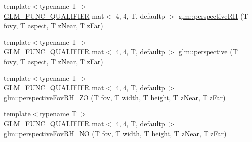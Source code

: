 \begin{DoxyCompactItemize}
\item 
{\footnotesize template$<$typename T $>$ }\\\mbox{\hyperlink{setup_8hpp_a33fdea6f91c5f834105f7415e2a64407}{G\+L\+M\+\_\+\+F\+U\+N\+C\+\_\+\+Q\+U\+A\+L\+I\+F\+I\+ER}} mat$<$ 4, 4, T, defaultp $>$ \mbox{\hyperlink{group__gtc__matrix__transform_ga26b88757fbd90601b80768a7e1ad3aa1}{glm\+::perspective\+RH}} (T fovy, T aspect, T \mbox{\hyperlink{_s_d_l__opengl__glext_8h_a12d99226e590bbaaf0be69169eeb4834}{z\+Near}}, T \mbox{\hyperlink{_s_d_l__opengl__glext_8h_a1052a8235df129542aea6da80fbec6a1}{z\+Far}})
\item 
{\footnotesize template$<$typename T $>$ }\\\mbox{\hyperlink{setup_8hpp_a33fdea6f91c5f834105f7415e2a64407}{G\+L\+M\+\_\+\+F\+U\+N\+C\+\_\+\+Q\+U\+A\+L\+I\+F\+I\+ER}} mat$<$ 4, 4, T, defaultp $>$ \mbox{\hyperlink{group__gtc__matrix__transform_ga747c8cf99458663dd7ad1bb3a2f07787}{glm\+::perspective}} (T fovy, T aspect, T \mbox{\hyperlink{_s_d_l__opengl__glext_8h_a12d99226e590bbaaf0be69169eeb4834}{z\+Near}}, T \mbox{\hyperlink{_s_d_l__opengl__glext_8h_a1052a8235df129542aea6da80fbec6a1}{z\+Far}})
\item 
{\footnotesize template$<$typename T $>$ }\\\mbox{\hyperlink{setup_8hpp_a33fdea6f91c5f834105f7415e2a64407}{G\+L\+M\+\_\+\+F\+U\+N\+C\+\_\+\+Q\+U\+A\+L\+I\+F\+I\+ER}} mat$<$ 4, 4, T, defaultp $>$ \mbox{\hyperlink{group__gtc__matrix__transform_ga7dcbb25331676f5b0795aced1a905c44}{glm\+::perspective\+Fov\+R\+H\+\_\+\+ZO}} (T fov, T \mbox{\hyperlink{_s_d_l__opengl_8h_a9a82cf3caff84cabc4598e2619faac17}{width}}, T \mbox{\hyperlink{_s_d_l__opengl_8h_aa352f2804b9902ac30769c00dde75d5f}{height}}, T \mbox{\hyperlink{_s_d_l__opengl__glext_8h_a12d99226e590bbaaf0be69169eeb4834}{z\+Near}}, T \mbox{\hyperlink{_s_d_l__opengl__glext_8h_a1052a8235df129542aea6da80fbec6a1}{z\+Far}})
\item 
{\footnotesize template$<$typename T $>$ }\\\mbox{\hyperlink{setup_8hpp_a33fdea6f91c5f834105f7415e2a64407}{G\+L\+M\+\_\+\+F\+U\+N\+C\+\_\+\+Q\+U\+A\+L\+I\+F\+I\+ER}} mat$<$ 4, 4, T, defaultp $>$ \mbox{\hyperlink{group__gtc__matrix__transform_ga257b733ff883c9a065801023cf243eb2}{glm\+::perspective\+Fov\+R\+H\+\_\+\+NO}} (T fov, T \mbox{\hyperlink{_s_d_l__opengl_8h_a9a82cf3caff84cabc4598e2619faac17}{width}}, T \mbox{\hyperlink{_s_d_l__opengl_8h_aa352f2804b9902ac30769c00dde75d5f}{height}}, T \mbox{\hyperlink{_s_d_l__opengl__glext_8h_a12d99226e590bbaaf0be69169eeb4834}{z\+Near}}, T \mbox{\hyperlink{_s_d_l__opengl__glext_8h_a1052a8235df129542aea6da80fbec6a1}{z\+Far}})

\end{DoxyCompactItemize}

